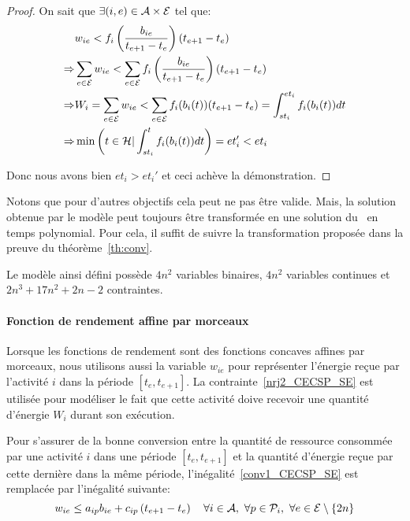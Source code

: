 \begin{proof}
On sait que $\exists (i,e) \in {\cal A} \times {\cal E}$ tel que:
\begin{align*}
  &w_{ie} < f_i\left(\frac{b_{ie}}{t_{e+1}-t_e}\right)(t_{e+1}-t_e)\\  
  \Rightarrow &\sum_{e \in  {\cal E}} w_{ie} < \sum_{e \in {\cal E}} f_i\left(
                \frac{b_{ie}}{t_{e+1}-t_e}\right)(t_{e+1}-t_e)\\ 
  \Rightarrow & W_i=\sum_{e \in  {\cal E}} w_{ie} < \sum_{e \in {\cal E}}
                f_i(b_i(t))(t_{e+1}-t_e)=\int_{st_i}^{et_i}
                f_i(b_i(t))dt \\
  \Rightarrow & \min\left(t \in {\cal H} |
                \int_{st_i}^{t}f_i(b_i(t))dt\right) = et_i' < et_i                 
\end{align*}

Donc nous avons bien $et_i > et_i'$ et ceci achève la démonstration.
\end{proof}

Notons que pour d'autres objectifs cela peut ne pas être valide. Mais, la
solution obtenue par le modèle peut toujours être transformée en une
solution du \CECSP~en temps polynomial. Pour cela, il suffit de suivre
la transformation proposée dans la preuve du théorème~\ref{th:conv}.

Le modèle ainsi défini possède $4n^2$ variables binaires, $4n^2$
variables continues et $2n^3+17n^2+2n-2$ contraintes.

\paragraph{Fonction de rendement affine par morceaux}

Lorsque les fonctions de rendement sont des fonctions concaves
affines par morceaux, nous utilisons aussi la variable $w_{ie}$ pour
représenter l'énergie reçue par l'activité $i$ dans la période
$[t_e,t_{e+1}]$. La contrainte~\eqref{nrj2_CECSP_SE} est utilisée pour
modéliser le fait que cette activité doive recevoir une quantité
d'énergie $W_i$ durant son exécution.

Pour s'assurer de la bonne conversion entre la quantité de ressource
consommée par une activité $i$ dans une période $[t_e,t_{e+1}]$ et la
quantité d'énergie reçue par cette dernière dans la même période,
l'inégalité~\eqref{conv1_CECSP_SE} est remplacée par l'inégalité
suivante:
\begin{equation}
w_{ie} \le a_{ip}b_{ie} + c_{ip}\left( t_{e+1} - t_e\right) \quad  
\forall i \in {\cal A},\ \forall p \in {\cal P}_i,\ \forall e \in {\cal E}\setminus\{2n\}  
\label{conv2_CECSP_SE}
\end{equation}

